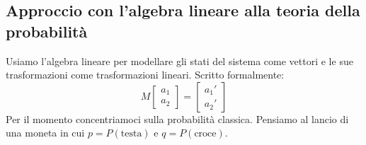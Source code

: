 \documentclass{article}
\begin{document}
    \subsection{Approccio con l'algebra lineare alla teoria della probabilità}
    Usiamo l'algebra lineare per modellare gli stati del sistema come vettori e le sue trasformazioni come trasformazioni lineari. Scritto formalmente:
    \begin{equation}
        M \begin{bmatrix}
            a_1
            \\a_2
        \end{bmatrix}
        = 
        \begin{bmatrix}
            a_1'
            \\a_2'
        \end{bmatrix}
    \end{equation}
    Per il momento concentriamoci sulla probabilità classica. Pensiamo al lancio di una moneta in cui $p = P(\text{testa})$ e $q = P(\text{croce})$.
\end{document}
